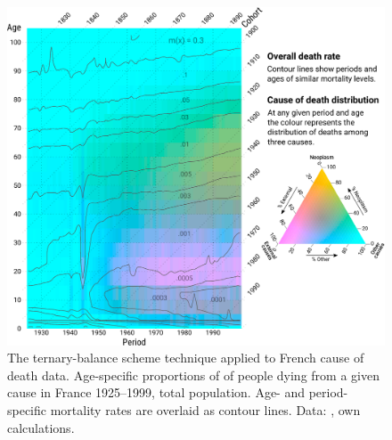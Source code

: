 \documentclass[parskip=half]{scrartcl}
\begin{document}
\begin{appendix}
\begin{figure}[!htb]
  \centering
  \includegraphics[width = \textwidth]{./fig/tern_balance_cont.pdf}
  \caption{The ternary-balance scheme technique applied to French cause of death data. Age-specific proportions of of people dying from a given cause in France 1925--1999, total population. Age- and period-specific mortality rates are overlaid as contour lines. Data: \cite{Vallin2014}, own calculations.}
  \label{fig:tbs_cont}
\end{figure}

\end{appendix}
\end{document}
